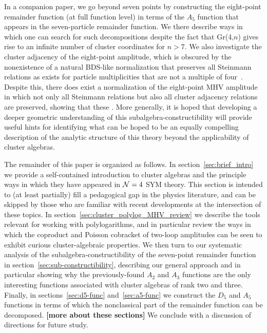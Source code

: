 \documentclass[11pt]{article}
\def\draftnote#1{{\bf [#1]}}
\begin{document}
\vspace{3cm}
In a companion paper, we go beyond seven points by constructing the eight-point remainder function (at full function level) in terms of the $A_5$ function that appears in the seven-particle remainder function. We there describe ways in which one can search for such decompositions despite the fact that Gr(4,$n$) gives rise to an infinite number of cluster coordinates for $n>7$. We also investigate the cluster adjacency of the eight-point amplitude, which is obscured by the nonexistence of a natural BDS-like normalization that preserves all Steinmann relations as exists for particle multiplicities that are not a multiple of four~\cite{}. Despite this, there does exist a normalization of the eight-point MHV amplitude in which not only all Steinmann relations but also all cluster adjacency relations are preserved, showing that these . More generally, it is hoped that developing a deeper geometric understanding of this subalgebra-constructibility will provide useful hints for identifying what can be hoped to be an equally compelling description of the analytic structure of this theory beyond the applicability of cluster algebras.



The remainder of this paper is organized as follows. In section~\ref{sec:brief_intro} we provide a self-contained introduction to cluster algebras and the principle ways in which they have appeared in ${\cal N} =4$ SYM theory. This section is intended to (at least partially) fill a pedagogical gap in the physics literature, and can be skipped by those who are familiar with recent developments at the intersection of these topics. In section~\ref{sec:cluster_polylog_MHV_review} we describe the tools relevant for working with polylogarithms, and in particular review the ways in which the coproduct and Poisson cobracket of two-loop amplitudes can be seen to exhibit curious cluster-algebraic properties. We then turn to our systematic analysis of the subalgebra-constructibility of the seven-point remainder function in section~\ref{sec:sub-constructibility}, describing our general approach and in particular showing why the previously-found $A_2$ and $A_3$ functions are the only interesting functions associated with cluster algebras of rank two and three. Finally, in sections~\ref{sec:d5-func} and~\ref{sec:a5-func} we construct the $D_5$ and $A_5$ functions in terms of which the nonclassical part of the remainder function can be decomposed. \draftnote{more about these sections} We conclude with a discussion of directions for future study.
\end{document}
